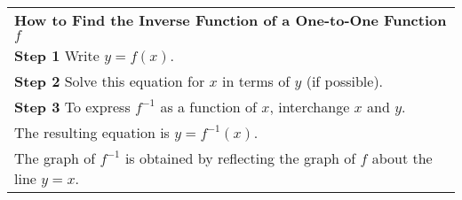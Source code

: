 \documentclass[fleqn]{article}
\begin{document}
\begin{center}
\def\arraystretch{1.3}
{\setlength{\tabcolsep}{16pt}
\begin{tabularx}{.9\textwidth}{|X|}
\hline
	\vspace{1pt}
	\textbf{How to Find the Inverse Function of a One-to-One Function $f$}\\[6pt]
	\hspace{12pt} \textbf{Step 1} \hspace{12pt} Write $y = f(x)$. \\
	\hspace{12pt} \textbf{Step 2} \hspace{12pt} Solve this equation for $x$ in terms of $y$ (if possible). \\
	\hspace{12pt} \textbf{Step 3} \hspace{12pt} To express $f^{-1}$ as a function of $x$, interchange $x$ and $y$.\\
	\hspace{55pt} \hspace{12pt} The resulting equation is $y = f^{-1}(x)$. \\[7pt]
	The graph of $f^{-1}$ is obtained by reflecting the graph of $f$ about the line $y = x$.
	\\[16pt]
\hline
\end{tabularx}}
\vspace{6pt}


\vspace{12pt}


\end{center}
\end{document}
